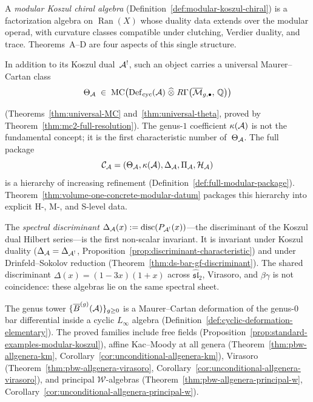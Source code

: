 A \emph{modular Koszul chiral algebra}
(Definition~\ref{def:modular-koszul-chiral}) is a factorization
algebra on $\operatorname{Ran}(X)$ whose duality data extends over
the modular operad, with curvature classes compatible under
clutching, Verdier duality, and trace.  Theorems~A--D are four
aspects of this single structure.

In addition to its Koszul dual~$\mathcal{A}^!$, such an object carries a
universal Maurer--Cartan class
\begin{equation}\label{eq:universal-MC}
\Theta_{\mathcal{A}} \;\in\;
\operatorname{MC}\!\left(
  \operatorname{Def}_{\mathrm{cyc}}(\mathcal{A})
  \;\widehat{\otimes}\;
  R\Gamma\!\left(\overline{\mathcal{M}}_{g,\bullet},\,
  \mathbb{Q}\right)
\right)
\end{equation}

(Theorems~\ref{thm:universal-MC}
and~\ref{thm:universal-theta}, proved by
Theorem~\ref{thm:mc2-full-resolution}).  The genus-$1$ coefficient
$\kappa(\mathcal{A})$ is not the fundamental concept; it is the first
characteristic number of~$\Theta_{\mathcal{A}}$.  The full package
\[
\mathcal{C}_{\mathcal{A}}
=
(\Theta_{\mathcal{A}}, \kappa(\mathcal{A}), \Delta_{\mathcal{A}}, \Pi_{\mathcal{A}}, \mathcal{H}_{\mathcal{A}})
\]
is a hierarchy of increasing refinement
(Definition~\ref{def:full-modular-package}).
Theorem~\ref{thm:volume-one-concrete-modular-datum} packages this
hierarchy into explicit H-, M-, and S-level data.

The \emph{spectral discriminant}
$\Delta_{\mathcal{A}}(x) := \operatorname{disc}(P_{\mathcal{A}^!}(x))$---the
discriminant of the Koszul dual Hilbert series---is the first
non-scalar invariant.  It is invariant under Koszul duality
($\Delta_{\mathcal{A}} = \Delta_{\mathcal{A}^!}$,
Proposition~\ref{prop:discriminant-characteristic})
and under Drinfeld--Sokolov reduction
(Theorem~\ref{thm:ds-bar-gf-discriminant}).  The shared
discriminant $\Delta(x) = (1-3x)(1+x)$ across
$\widehat{\mathfrak{sl}}_2$, Virasoro, and $\beta\gamma$ is not
coincidence: these algebras lie on the same spectral sheet.

The genus tower $\{\overline{B}^{(g)}(\mathcal{A})\}_{g \geq 0}$ is a
Maurer--Cartan deformation of the genus-$0$ bar differential
inside a cyclic $L_\infty$ algebra
(Definition~\ref{def:cyclic-deformation-elementary}).  The proved
families include free fields
(Proposition~\ref{prop:standard-examples-modular-koszul}), affine
Kac--Moody at all genera
(Theorem~\ref{thm:pbw-allgenera-km},
Corollary~\ref{cor:unconditional-allgenera-km}), Virasoro
(Theorem~\ref{thm:pbw-allgenera-virasoro},
Corollary~\ref{cor:unconditional-allgenera-virasoro}), and
principal $\mathcal{W}$-algebras
(Theorem~\ref{thm:pbw-allgenera-principal-w},
Corollary~\ref{cor:unconditional-allgenera-principal-w}).

